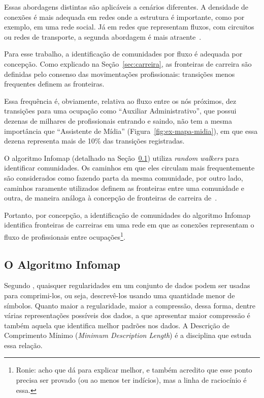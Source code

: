 \documentclass[
  article,
  11pt,
  a4paper,
  english,
  brazil,
  sumario=tradicional]{abntex2}
\begin{document}
Essas abordagens distintas são aplicáveis a cenários diferentes. A densidade de conexões é mais adequada em redes onde a estrutura é importante, como por exemplo, em uma rede social. Já em redes que representam fluxos, com circuitos ou redes de transporte, a segunda abordagem é mais atraente~\cite{Rosvall2009-sd}.

Para esse trabalho, a identificação de comunidades por fluxo é adequada por concepção. Como explicado na Seção~\ref{sec:carreira}, as fronteiras de carreira são definidas pelo consenso das movimentações profissionais: transições menos frequentes definem as fronteiras.

Essa frequência é, obviamente, relativa ao fluxo entre os nós próximos, dez transições para uma ocupação como \enquote{Auxiliar Administrativo}, que possui dezenas de milhares de profissionais entrando e saindo, não tem a mesma importância que \enquote{Assistente de Mídia} (Figura~\ref{fig:ex-mapa-midia}), em que essa dezena representa mais de 10\% das transições registradas.

O algoritmo Infomap (detalhado na Seção~\ref{sec:infomap}) utiliza \textit{random walkers} para identificar comunidades. Os caminhos em que eles circulam mais frequentemente são considerados como fazendo parta da mesma comunidade, por outro lado, caminhos raramente utilizados definem as fronteiras entre uma comunidade e outra, de maneira análoga à concepção de fronteiras de carreira de~.

Portanto, por concepção, a identificação de comunidades do algoritmo Infomap identifica fronteiras de carreiras em uma rede em que as conexões representam o fluxo de profissionais entre ocupações\footnote{Ronie: acho que dá para explicar melhor, e também acredito que esse ponto precisa ser provado (ou ao menos ter indícios), mas a linha de raciocínio é essa.}.

\subsection{O Algoritmo Infomap} \label{sec:infomap}

Segundo , quaisquer regularidades em um conjunto de dados podem ser usadas para comprimi-los, ou seja, descrevê-los usando uma quantidade menor de símbolos. Quanto maior a regularidade, maior a compressão, dessa forma, dentre várias representações possíveis dos dados, a que apresentar maior compressão é também aquela que identifica melhor padrões nos dados. A Descrição de Comprimento Mínimo (\textit{Minimum Description Length}) é a disciplina que estuda essa relação.
\end{document}
